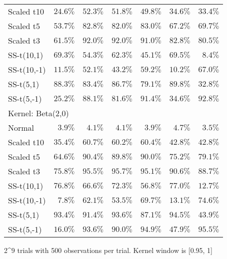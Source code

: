 \begin{longtable}{lrrrrrr}
Scaled t10 & $24.6\%$ & $52.3\%$ & $51.8\%$ & $49.8\%$ & $34.6\%$ & $33.4\%$ \\ 
Scaled t5 & $53.7\%$ & $82.8\%$ & $82.0\%$ & $83.0\%$ & $67.2\%$ & $69.7\%$ \\ 
Scaled t3 & $61.5\%$ & $92.0\%$ & $92.0\%$ & $91.0\%$ & $82.8\%$ & $80.5\%$ \\ 
SS-t(10,1) & $69.3\%$ & $54.3\%$ & $62.3\%$ & $45.1\%$ & $69.5\%$ & $8.4\%$ \\ 
SS-t(10,-1) & $11.5\%$ & $52.1\%$ & $43.2\%$ & $59.2\%$ & $10.2\%$ & $67.0\%$ \\ 
SS-t(5,1) & $88.3\%$ & $83.4\%$ & $86.7\%$ & $79.1\%$ & $89.8\%$ & $32.8\%$ \\ 
SS-t(5,-1) & $25.2\%$ & $88.1\%$ & $81.6\%$ & $91.4\%$ & $34.6\%$ & $92.8\%$ \\ 
\midrule
\multicolumn{7}{l}{Kernel: Beta(2,0)} \\ 
\midrule
Normal & $3.9\%$ & $4.1\%$ & $4.1\%$ & $3.9\%$ & $4.7\%$ & $3.5\%$ \\ 
Scaled t10 & $35.4\%$ & $60.7\%$ & $60.2\%$ & $60.4\%$ & $42.8\%$ & $42.8\%$ \\ 
Scaled t5 & $64.6\%$ & $90.4\%$ & $89.8\%$ & $90.0\%$ & $75.2\%$ & $79.1\%$ \\ 
Scaled t3 & $75.8\%$ & $95.5\%$ & $95.7\%$ & $95.1\%$ & $90.6\%$ & $88.7\%$ \\ 
SS-t(10,1) & $76.8\%$ & $66.6\%$ & $72.3\%$ & $56.8\%$ & $77.0\%$ & $12.7\%$ \\ 
SS-t(10,-1) & $7.8\%$ & $62.1\%$ & $53.5\%$ & $69.7\%$ & $13.1\%$ & $74.6\%$ \\ 
SS-t(5,1) & $93.4\%$ & $91.4\%$ & $93.6\%$ & $87.1\%$ & $94.5\%$ & $43.9\%$ \\ 
SS-t(5,-1) & $16.0\%$ & $93.6\%$ & $90.0\%$ & $94.9\%$ & $47.9\%$ & $95.5\%$ \\ 
\bottomrule
\end{longtable}
\begin{minipage}{\linewidth}
2\textasciicircum{}9 trials with 500 observations per trial. Kernel window is [0.95, 1]\\
\end{minipage}

